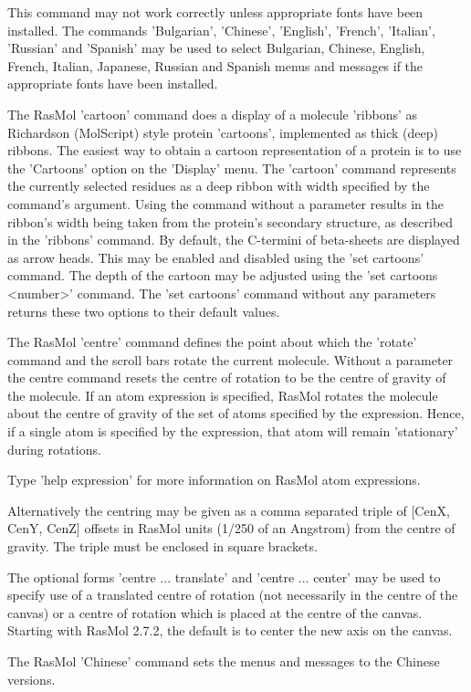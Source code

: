 This command may not work correctly unless appropriate fonts
have been installed.  The commands
'Bulgarian',
'Chinese',
'English',
'French',
'Italian',
'Russian'
and
'Spanish'
may be used to select Bulgarian, Chinese, English, French,
Italian, Japanese, Russian and Spanish menus and messages if the
appropriate fonts have been installed.

The RasMol
'cartoon'
command does a display of a molecule
'ribbons'
as Richardson (MolScript) style protein
'cartoons',
implemented as thick (deep) ribbons. The
easiest way to obtain a cartoon representation of a protein is
to use the
'Cartoons'
option on the
'Display'
menu. The
'cartoon'
command represents the currently selected residues
as a deep ribbon with width specified by the command's argument.
Using the command without a parameter results in the ribbon's
width being taken from the protein's secondary structure,
as described in the
'ribbons'
command. By default, the C-termini of beta-sheets are displayed
as arrow heads. This may be enabled and disabled using the
'set cartoons'
command.
The depth of the cartoon may be adjusted using the
'set cartoons <number>'
command. The
'set cartoons'
command without any parameters returns these two options
to their default values.

The RasMol
'centre'
command defines the point about which the
'rotate'
command and the scroll bars rotate the current molecule. Without a
parameter the centre command resets the centre of rotation to be the
centre of gravity of the molecule. If an atom expression is specified,
RasMol rotates the molecule about the centre of gravity of the set of
atoms specified by the expression. Hence, if a single atom is specified
by the expression, that atom will remain 'stationary' during rotations.

Type
'help expression'
for more information on RasMol atom expressions.

Alternatively the centring may be given as a comma separated triple of
[CenX, CenY, CenZ] offsets in RasMol units (1/250 of an Angstrom) from
the centre of gravity.  The triple must be enclosed in square brackets.

The optional forms
'centre ... translate'
and
'centre ... center'
may be used to specify use of a translated centre of rotation (not
necessarily in the centre of the canvas) or a centre of rotation
which is placed at the centre of the canvas.  Starting with
RasMol 2.7.2, the default is
to center the new axis on the canvas.

The RasMol
'Chinese'
command sets the menus and messages to the Chinese versions.

